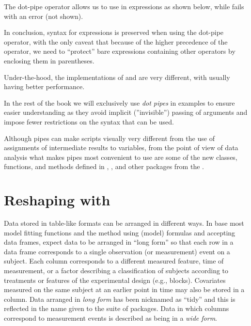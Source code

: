 \documentclass[krantz2]{krantz}\usepackage{knitr}
\begin{document}
The dot-pipe operator allows us to use  in expressions as shown below, while \Roperator{\%>\%} fails with an error (not shown).

\begin{knitrout}\footnotesize
{}\color{fgcolor}
\end{knitrout}

\begin{explainbox}
In conclusion, \Rlang syntax for expressions is preserved when using the dot-pipe operator, with the only caveat that because of the higher precedence of the  operator, we need to ``protect'' bare expressions containing other operators by enclosing them in parentheses.
\end{explainbox}

Under-the-hood, the implementations of \Roperator{\%>\%} and  are very different, with  usually having better performance.

In the rest of the book we will exclusively use \emph{dot pipes} in examples to ensure easier understanding as they avoid implicit (''invisible'') passing of arguments and impose fewer restrictions on the syntax that can be used.

Although pipes can make scripts visually very different from the use of assignments of intermediate results to variables, from the point of view of data analysis what makes pipes most convenient to use are some of the new classes, functions, and methods defined in , , and other packages from the .

\section{Reshaping with }
Data stored in table-like formats can be arranged in different ways. In base \Rlang most model fitting functions and the  method using (model) formulas and accepting data frames, expect data to be arranged in ``long form'' so that each row in a data frame corresponds to a single observation (or measurement) event on a subject. Each column corresponds to a different measured feature, time of measurement, or a factor describing a classification of subjects according to treatments or features of the experimental design (e.g., blocks). Covariates measured on the same subject at an earlier point in time may also be stored in a column. Data arranged in \emph{long form} has been nicknamed as ``tidy'' and this is reflected in the name given to the  suite of packages. Data in which columns correspond to measurement events is described as being in a \emph{wide form}.
\end{document}
